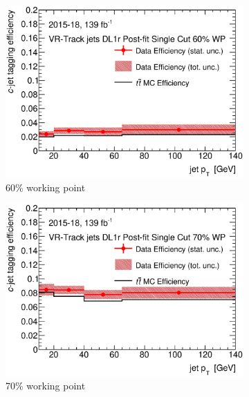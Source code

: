 	\begin{figure}[H]
		\centering
		\begin{subfigure}[t]{.35\linewidth}
			\includegraphics[width=1\textwidth]{FTAG_plots/DL1rallVRJetsDec/eff60.eps}
			\caption{60\% working point}
				\end{subfigure}
			\begin{subfigure}[t]{.35\linewidth}
				\includegraphics[width=1\textwidth]{FTAG_plots/DL1rallVRJetsDec/eff70.eps}
				\caption{70\% working point}
			\end{subfigure}
			\begin{subfigure}[t]{.35\linewidth}

\end{subfigure}
\end{figure}
